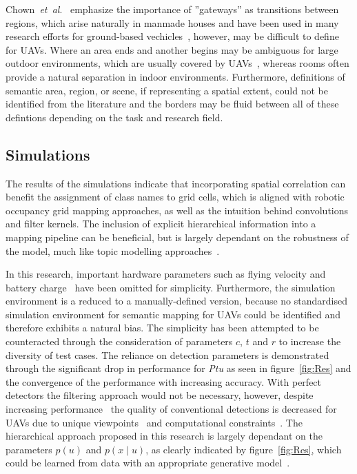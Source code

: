 \documentclass[twocolumn,letterpaper]{IEEEAerospaceCLS}  %
\newcommand{\abbreviation}[1]{\emph{#1}.}
\newcommand{\etal}{\abbreviation{et~al}}
\begin{document}
Chown~\etal~\cite{chown_prototypes_1995} emphasize the importance of ''gateways'' as transitions between regions, which arise naturally in manmade houses and have been used in many research efforts for ground-based vechicles~\cite{kuipers_local_2004,wu_learning_2018,krishnan_visual_2010}, however, may be difficult to define for UAVs. Where an area ends and another begins may be ambiguous for large outdoor environments, which are usually covered by UAVs~\cite{vanegas_novel_2018,shetty_implementation_2020}, whereas rooms often provide a natural separation in indoor environments. Furthermore, definitions of semantic area, region, or scene, if representing a spatial extent, could not be identified from the literature and the borders may be fluid between all of these defintions depending on the task and research field.

\subsection{Simulations} \label{ssec:ConclSim}
The results of the simulations indicate that incorporating spatial correlation can benefit the assignment of class names to grid cells, which is aligned with robotic occupancy grid mapping approaches, as well as the intuition behind convolutions and filter kernels. The inclusion of explicit hierarchical information into a mapping pipeline can be beneficial, but is largely dependant on the robustness of the model, much like topic modelling approaches~\cite{fei-fei_bayesian_2005,blei_latent_2003}.

In this research, important hardware parameters such as flying velocity and battery charge~\cite{boroujerdian_mavbench_2018} have been omitted for simplicity. Furthermore, the simulation environment is a reduced to a manually-defined version, because no standardised simulation environment for semantic mapping for UAVs could be identified and therefore exhibits a natural bias. The simplicity has been attempted to be counteracted through the consideration of parameters $c$, $t$ and $r$ to increase the diversity of test cases.   
The reliance on detection parameters is demonstrated through the significant drop in performance for \emph{Ptu} as seen in figure~\ref{fig:Res} and the convergence of the performance with increasing accuracy. With perfect detectors the filtering approach would not be necessary, however, despite increasing performance~\cite{alom_history_2018} the quality of conventional detections is decreased for UAVs due to unique viewpoints~\cite{richardwebster_psyphy:_2019} and computational constraints~\cite{krishnan_sky_2020}. The hierarchical approach proposed in this research is largely dependant on the parameters $p(u)$ and $p(x\mid u)$, as clearly indicated by figure~\ref{fig:Res}, which could be learned from data with an appropriate generative model~\cite{blei_latent_2003,lienou_semantic_2010}.
\end{document}
